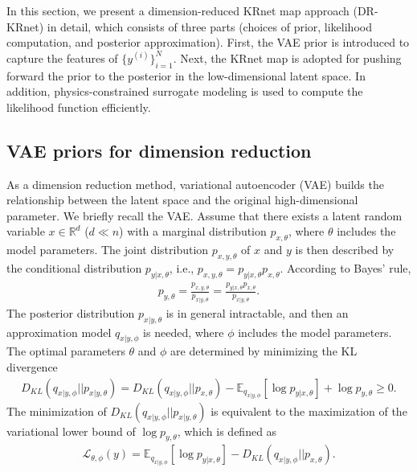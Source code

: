 In this section, we present a dimension-reduced KRnet map approach (DR-KRnet) in detail, which consists of three parts (choices of prior, likelihood computation, and posterior approximation).
First, the VAE prior is introduced to capture the features of $\{y^{(i)}\}_{i=1}^N$. Next, the KRnet map is adopted for pushing forward the prior to the posterior in the low-dimensional latent space. In addition, physics-constrained surrogate modeling is used to compute the likelihood function efficiently.
\subsection{VAE priors for dimension reduction}\label{vae_gan_section}
As a dimension reduction method, variational autoencoder (VAE) builds the relationship between the latent space and the original high-dimensional parameter. We briefly recall the VAE. Assume that there exists a latent random variable $x\in \mathbb{R}^d$ ($d\ll n$) with a marginal distribution $p_{x,\theta}$, where $\theta$ includes the model parameters. The joint distribution $p_{x,y,\theta}$ of $x$ and $y$ is then described by the conditional distribution $p_{y|x,\theta}$, i.e., $p_{x,y,\theta}=p_{y|x,\theta}p_{x,\theta}$.
 According to Bayes' rule,
\begin{align}
    p_{y,\theta}=\frac{p_{x,y,\theta}}{p_{x|y,\theta}}=\frac{p_{y|x,\theta}p_{x,\theta}}{p_{x|y,\theta}}.
\end{align}
The posterior distribution $p_{x|y,\theta}$ is in general
intractable, and then an approximation model $q_{x|y,\phi}$ is needed, where $\phi$ includes the model parameters. The optimal parameters $\theta$ and $\phi$ are determined by minimizing the KL divergence
\begin{align}
    D_{KL}(q_{x|y,\phi}||p_{x|y,\theta})=D_{KL}(q_{x|y,\phi}||p_{x,\theta})-\mathbb{E}_{q_{x|y,\phi}}[\log p_{y|x,\theta} ]+\log p_{y,\theta}\geq 0.
\end{align}
The minimization of $D_{KL}(q_{x|y,\phi}||p_{x|y,\theta})$ is equivalent to the maximization of
the variational lower bound of $\log p_{y,\theta}$, which is defined as 
\begin{align}\label{eq_vae_loss}
    \mathcal{L}_{\theta,\phi}(y)=\mathbb{E}_{q_{x|y,\phi}}[\log p_{y|x,\theta} ]-D_{KL}(q_{x|y,\phi}||p_{x,\theta}).
\end{align}
